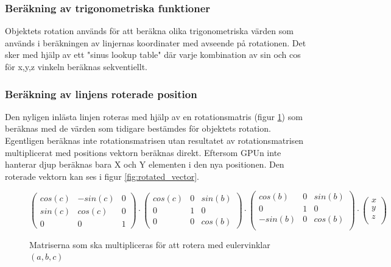 \documentclass[a4paper]{article}
\begin{document}
    \subsubsection{Beräkning av trigonometriska funktioner}
    Objektets rotation används för att beräkna olika trigonometriska värden som
    används i beräkningen av linjernas koordinater med avseende på rotationen. Det
    sker med hjälp av ett "sinus lookup table" där varje kombination av sin och cos
    för x,y,z vinkeln beräknas sekventiellt. 

    \subsubsection{Beräkning av linjens roterade position}
    Den nyligen inlästa linjen roteras med hjälp av en rotationsmatris (figur
    \ref{fig:rot_matrix}) som beräknas med de värden som tidigare bestämdes för
    objektets rotation. Egentligen beräknas inte rotationsmatrisen utan
    resultatet av rotationsmatrisen multiplicerat med positions vektorn beräknas
    direkt. Eftersom GPUn inte hanterar djup beräknas bara X och  Y
    elementen i den nya positionen. Den roterade vektorn kan ses i
    figur \ref{fig:rotated_vector}. 

    \begin{figure}
        \[
            \begin{pmatrix}
                cos(c) & -sin(c) & 0 \\ 
                sin(c) & cos(c)  & 0 \\
                0      &    0    & 1
            \end{pmatrix}
            \cdot
            \begin{pmatrix}
                cos(c)  &    0    & sin(b) \\ 
                0       &    1    & 0 \\
                0       &    0    & cos(b)
            \end{pmatrix}
            \cdot
            \begin{pmatrix}
                cos(b) & 0 & sin(b) \\ 
                0 & 1  & 0 \\
                -sin(b)      &    0    & cos(b) \\
            \end{pmatrix}
            \cdot
            \begin{pmatrix}
                x \\
                y \\
                z \\
            \end{pmatrix}
        \]
        \caption{Matriserna som ska multipliceras för att rotera med eulervinklar \((a, b, c)\)}
        \label{fig:rot_matrix}
    \end{figure}
\end{document}

